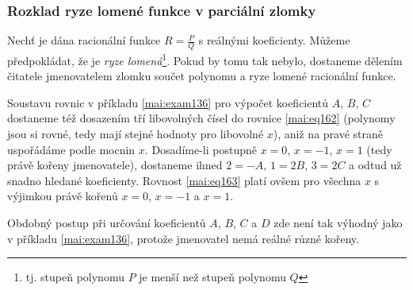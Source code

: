       
      
    \subsubsection{Rozklad ryze lomené funkce v parciální zlomky}
    Nechť je dána racionální funkce $R = \frac{P}{Q}$ s reálnými koeficienty. Můžeme
    předpokládat, že je \emph{ryze lomená}\footnote{tj. stupeň polynomu $P$ je menší než
    stupeň polynomu $Q$}. Pokud by tomu tak nebylo, dostaneme dělením čitatele jmenovatelem
    zlomku součet polynomu a ryze lomené racionální funkce.

    

    Soustavu rovnic v příkladu \eqref{mai:exam136} pro výpočet koeficientů \(A\), \(B\), \(C\)
    dostaneme též dosazením tří libovolných čísel do rovnice \ref{mai:eq162} (polynomy jsou si
    rovné, tedy mají stejné hodnoty pro libovolné \(x\)), aniž na pravé straně uspořádáme podle
    mocnin \(x\). Dosadíme-li postupně \(x=0\), \(x=-1\), \(x=1\) (tedy právě kořeny jmenovatele),
    dostaneme ihned \(2=-A\), \(1=2B\), \(3=2C\) a odtud už snadno hledané koeficienty. Rovnost
    \ref{mai:eq163} platí ovšem pro všechna \(x\) s výjimkou právě kořenů  \(x=0\), \(x=-1\) a
    \(x=1\).

    

    Obdobný postup při určování koeficientů \(A\), \(B\), \(C\) a \(D\) zde není tak výhodný jako
    v příkladu \eqref{mai:exam136}, protože jmenovatel nemá reálné různé kořeny. 

    

    
    
    
      
